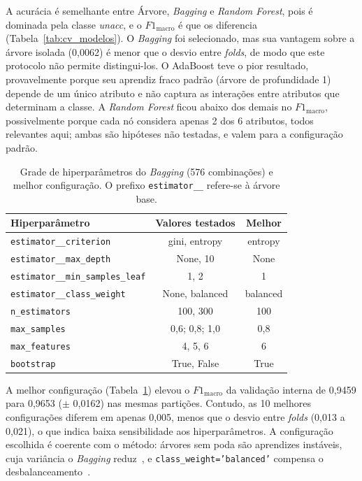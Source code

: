 \documentclass[11pt, a4paper]{article}
\begin{document}
A acurácia é semelhante entre Árvore, \textit{Bagging} e \textit{Random Forest}, pois é dominada pela classe \textit{unacc}, e o $F1_{\mathrm{macro}}$ é que os diferencia (Tabela~\ref{tab:cv_modelos}). O \textit{Bagging} foi selecionado, mas sua vantagem sobre a árvore isolada (0{,}0062) é menor que o desvio entre \textit{folds}, de modo que este protocolo não permite distingui-los. O AdaBoost teve o pior resultado, provavelmente porque seu aprendiz fraco padrão (árvore de profundidade 1) depende de um único atributo e não captura as interações entre atributos que determinam a classe. A \textit{Random Forest} ficou abaixo dos demais no $F1_{\mathrm{macro}}$, possivelmente porque cada nó considera apenas 2 dos 6 atributos, todos relevantes aqui; ambas são hipóteses não testadas, e valem para a configuração padrão.

\begin{table}[htbp]
\centering
\caption{Grade de hiperparâmetros do \textit{Bagging} (576 combinações) e melhor configuração. O prefixo \texttt{estimator\_\_} refere-se à árvore base.}
\label{tab:grid}
\begin{tabular}{lcc}
\toprule
Hiperparâmetro & Valores testados & Melhor \\
\midrule
\texttt{estimator\_\_criterion}          & gini, entropy        & entropy \\
\texttt{estimator\_\_max\_depth}         & None, 10             & None \\
\texttt{estimator\_\_min\_samples\_leaf} & 1, 2                 & 1 \\
\texttt{estimator\_\_class\_weight}      & None, balanced       & balanced \\
\texttt{n\_estimators}                   & 100, 300             & 100 \\
\texttt{max\_samples}                    & 0{,}6; 0{,}8; 1{,}0  & 0{,}8 \\
\texttt{max\_features}                   & 4, 5, 6              & 6 \\
\texttt{bootstrap}                       & True, False          & True \\
\bottomrule
\end{tabular}
\end{table}

A melhor configuração (Tabela~\ref{tab:grid}) elevou o $F1_{\mathrm{macro}}$ da validação interna de 0{,}9459 para 0{,}9653 ($\pm$ 0{,}0162) nas mesmas partições. Contudo, as 10 melhores configurações diferem em apenas 0{,}005, menos que o desvio entre \textit{folds} (0{,}013 a 0{,}021), o que indica baixa sensibilidade aos hiperparâmetros. A configuração escolhida é coerente com o método: árvores sem poda são aprendizes instáveis, cuja variância o \textit{Bagging} reduz~\cite{breiman1996bagging}, e \texttt{class\_weight='balanced'} compensa o desbalanceamento~\cite{he2009}.
\end{document}
